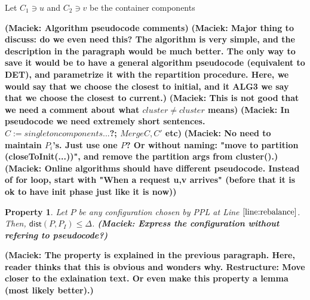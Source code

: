 \documentclass[manuscript,screen=true, review, anonymous]{acmart}
\newcommand{\PPL}{\textsf{PPL}\xspace}
\newcommand{\dist}{\textsf{dist}}
\newtheorem{property}{Property}
\DeclarePairedDelimiter\set{\{}{\}}
\newcommand\maciek[1]{\color{brown}\textbf{(Maciek: #1)}\color{black}}
\begin{document}
\label{alg:PPL}
\begin{algorithm}
	\renewcommand{\algorithmicrequire}{\textbf{Input:}}
	\renewcommand{\algorithmicensure}{\textbf{Output:}}
	\begin{algorithmic}
		\label{line:initcomponents}
		\STATE Let $C_1 \ni u$ and $C_2 \ni v$ be the container components
		 \label{line:mergecomponents}
		\label{line:rebalance} 
		\ENDIF
		\ENDIF
		\ENDFOR
	\end{algorithmic}
	\caption{Perfect Partition Learner (\PPL)}
	\label{alg:ppl}
\end{algorithm}


\maciek{Algorithm pseudocode comments}
\maciek{Major thing to discuss: do we even need this? The algorithm is very simple, and the description in the paragraph would be much better. The only way to save it would be to have a general algorithm pseudocode (equivalent to DET), and parametrize it with the repartition procedure. Here, we would say that we choose the closest to initial, and it ALG3 we say that we choose the closest to current.}
\maciek{This is not good that we need a comment about what $cluster \neq cluster$ means}
\maciek{In pseudocode we need extremely short sentences. $C := singleton components ... $?; $Merge C, C'$ etc}
\maciek{No need to maintain $P_i$'s. Just use one $P$? Or without naming: "move to partition (closeToInit(...))", and remove the partition args from cluster().}
\maciek{Online algorithms should have different pseudocode. Instead of for loop, start with "When a request u,v arrives" (before that it is ok to have init phase just like it is now)}

\begin{property} \label{prop:dist<OPT}
	Let $P$ be any configuration chosen by \PPL at Line $\ref{line:rebalance}$.
	Then, $\dist(P,P_I) \leq \Delta$.
	\maciek{Express the configuration without refering to pseudocode?}
\end{property}
\maciek{The property is explained in the previous paragraph. Here, reader thinks that this is obvious and wonders why. Restructure: Move closer to the exlaination text. Or even make this property a lemma (most likely better).}
\end{document}
